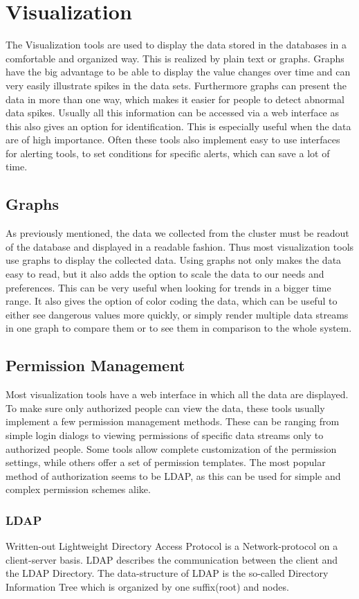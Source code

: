 \section{Visualization} 
The Visualization tools are used to display the data stored in the databases in a comfortable and organized way. This is realized by plain text or graphs. Graphs have the big advantage to be able to display the value changes over time and can very easily illustrate spikes in the data sets. Furthermore graphs can present the data in more than one way, which makes it easier for people to detect abnormal data spikes.
Usually all this information can be accessed via a web interface as this also gives an option for identification. This is especially useful when the data are of high importance.
Often these tools also implement easy to use interfaces for alerting tools, to set conditions for specific alerts, which can save a lot of time.

\subsection{Graphs}
As previously mentioned, the data we collected from the cluster must be readout of the database and displayed in a readable fashion. Thus most visualization tools use graphs to display the collected data. 
Using graphs not only makes the data easy to read, but it also adds the option to scale the data to our needs and preferences. This can be very useful when looking for trends in a bigger time range.
It also gives the option of color coding the data, which can be useful to either see dangerous values more quickly, or simply render multiple data streams in one graph to compare them or to see them in comparison to the whole system.
\subsection{Permission Management}
Most visualization tools have a web interface in which all the data are displayed. To make sure only authorized people can view the data, these tools usually implement a few permission management methods. 
These can be ranging from simple login dialogs to viewing permissions of specific data streams only to authorized people. Some tools allow complete customization of the permission settings, while others offer a set of permission templates. The most popular method of authorization seems to be LDAP, as this can be used for simple and complex permission schemes alike. 
\subsubsection{LDAP}
\label{ldap}
Written-out Lightweight Directory Access Protocol is a Network-protocol on a client-server basis. LDAP describes the communication between the client and the LDAP Directory. The data-structure of LDAP is the so-called Directory Information Tree which is organized by one suffix(root) and nodes.  

